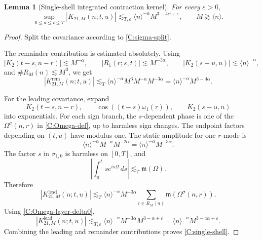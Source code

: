 \documentclass[10pt]{amsart}
\numberwithin{equation}{section}
\theoremstyle{plain}
\newtheorem{lemma}[theorem]{Lemma}
\theoremstyle{definition}
\theoremstyle{remark}
\newcommand{\eps}{\varepsilon}
\newcommand{\la}{\langle}
\newcommand{\ra}{\rangle}
\newcommand{\frakm}{\mathfrak{m}}
\begin{document}
\begin{lemma}[Single-shell integrated contraction kernel]\label{lem:C-single-shell}
For every \(\eps>0\),
\begin{equation}\label{C:single-shell}
        \sup_{0\le u\le t\le T}|K_{21,M}(n;t,u)|
        \lesssim_{T,\eps}
        \la n\ra^{-\alpha}M^{3-4\alpha+\eps},
        \qquad M\gtrsim\la n\ra.
\end{equation}
\end{lemma}

\begin{proof}
Split the covariance according to \eqref{C:sigma-split}.

The remainder contribution is estimated absolutely.  Using
\[
        |K_2(t-s,n-r)|\lesssim M^{-\alpha},
        \qquad
        |R_1(r;s,t)|\lesssim M^{-3\alpha},
        \qquad
        |K_2(s-u,n)|\lesssim\la n\ra^{-\alpha},
\]
and \(\#R_M(n)\lesssim M^3\), we get
\[
        |K^{\mathrm{rem}}_{21,M}(n;t,u)|
        \lesssim_T
        \la n\ra^{-\alpha}M^3M^{-\alpha}M^{-3\alpha}
        =\la n\ra^{-\alpha}M^{3-4\alpha}.
\]

For the leading covariance, expand
\[
        K_2(t-s,n-r),\qquad
        \cos((t-s)\omega_1(r)),\qquad
        K_2(s-u,n)
\]
into exponentials.  For each sign branch, the \(s\)-dependent phase is one of the \(\Omega^\sigma(n,r)\) in \eqref{C:Omega-def}, up to harmless sign changes.  The endpoint factors depending on \((t,u)\) have modulus one.  The static amplitude for one \(r\)-mode is
\[
        \la n\ra^{-\alpha}M^{-\alpha}M^{-2\alpha}
        =\la n\ra^{-\alpha}M^{-3\alpha}.
\]
The factor \(s\) in \(\sigma_{1,0}\) is harmless on \([0,T]\), and
\[
        \left|\int_u^t s e^{is\Omega}\,ds\right|
        \lesssim_T \frakm(\Omega).
\]
Therefore
\[
        |K^{\mathrm{lead}}_{21,M}(n;t,u)|
        \lesssim_T
        \la n\ra^{-\alpha}M^{-3\alpha}
        \sum_{r\in R_M(n)}\frakm(\Omega^\sigma(n,r)).
\]
Using \eqref{C:Omega-layer-delta0},
\[
        |K^{\mathrm{lead}}_{21,M}(n;t,u)|
        \lesssim_{T,\eps}
        \la n\ra^{-\alpha}M^{-3\alpha}M^{3-\alpha+\eps}
        =\la n\ra^{-\alpha}M^{3-4\alpha+\eps}.
\]
Combining the leading and remainder contributions proves \eqref{C:single-shell}.
\end{proof}
\end{document}
